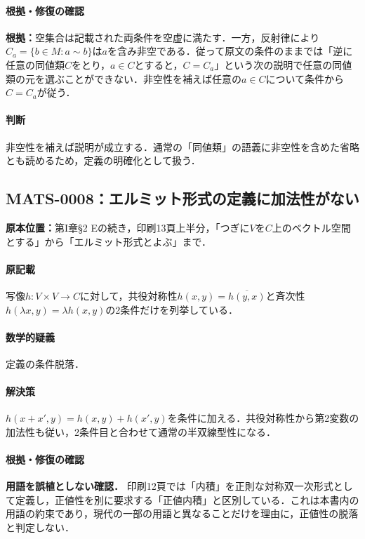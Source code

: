 \documentclass[a4paper,10pt]{ltjsarticle}
\begin{document}
\paragraph{根拠・修復の確認}\textbf{根拠：}空集合は記載された両条件を空虚に満たす．一方，反射律により$C_a=\{b\in M:a\sim b\}$は$a$を含み非空である．従って原文の条件のままでは「逆に任意の同値類$C$をとり，$a\in C$とすると，$C=C_a$」という次の説明で任意の同値類の元を選ぶことができない．非空性を補えば任意の$a\in C$について条件から$C=C_a$が従う．

\paragraph{判断}非空性を補えば説明が成立する．通常の「同値類」の語義に非空性を含めた省略とも読めるため，定義の明確化として扱う．


\subsection*{MATS-0008：エルミット形式の定義に加法性がない}\label{math:MATS-0008}
\noindent\textbf{原本位置：}第I章\S2 Eの続き，印刷13頁上半分，「つぎに$V$を$C$上のベクトル空間とする」から「エルミット形式とよぶ」まで．

\paragraph{原記載}写像$h:V\times V\to C$に対して，共役対称性$h(x,y)=\overline{h(y,x)}$と斉次性$h(\lambda x,y)=\lambda h(x,y)$の2条件だけを列挙している．

\paragraph{数学的疑義}定義の条件脱落．

\paragraph{解決策}$h(x+x',y)=h(x,y)+h(x',y)$を条件に加える．共役対称性から第2変数の加法性も従い，2条件目と合わせて通常の半双線型性になる．

\paragraph{根拠・修復の確認}\par\textbf{用語を誤植としない確認．}
印刷12頁では「内積」を正則な対称双一次形式として定義し，正値性を別に要求する「正値内積」と区別している．これは本書内の用語の約束であり，現代の一部の用語と異なることだけを理由に，正値性の脱落と判定しない．
\end{document}
